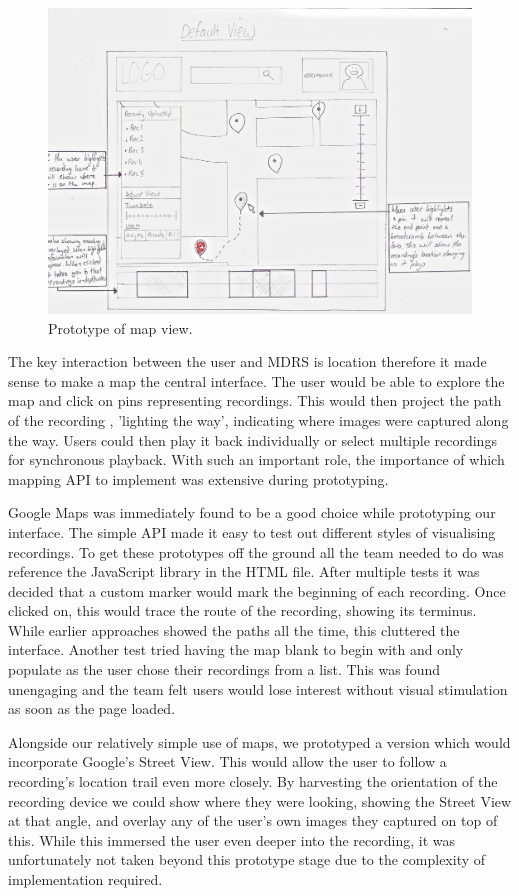 \documentclass{l3proj}
\begin{document}
\begin{figure}[ht!]
\centering
\includegraphics[width=.85\textwidth]{images/web-map-view.jpg}
\caption{Prototype of map view.}
\end{figure}

The key interaction between the user and MDRS is location therefore it made sense to make a map the central interface. The user would be able to explore the map and click on pins representing recordings. This would then project the path of the recording , 'lighting the way', indicating where images were captured along the way. Users could then play it back individually or select multiple recordings for synchronous playback. With such an important role, the importance of which mapping \gls{API} to implement was extensive during prototyping.

Google Maps was immediately found to be a good choice while prototyping our interface. The simple API made it easy to test out different styles of visualising recordings. To get these prototypes off the ground all the team needed to do was  reference the \gls{JavaScript} library in the \gls{HTML} file. After multiple tests it was decided that a custom marker would mark the beginning of each recording. Once clicked on, this would trace the route of the recording, showing its terminus. While earlier approaches showed the paths all the time, this cluttered the interface. Another test tried having the map blank to begin with and only populate as the user chose their recordings from a list. This was found unengaging and the team felt users would lose interest without visual stimulation as soon as the page loaded.

Alongside our relatively simple use of maps, we prototyped a version which would incorporate Google's Street View. This would allow the user to follow a recording's location trail even more closely. By harvesting the orientation of the recording device we could show where they were looking, showing the Street View at that angle, and overlay any of the user's own images they captured on top of this. While this immersed the user even deeper into the recording, it was unfortunately not taken beyond this prototype stage due to the complexity of implementation required.
\end{document}
